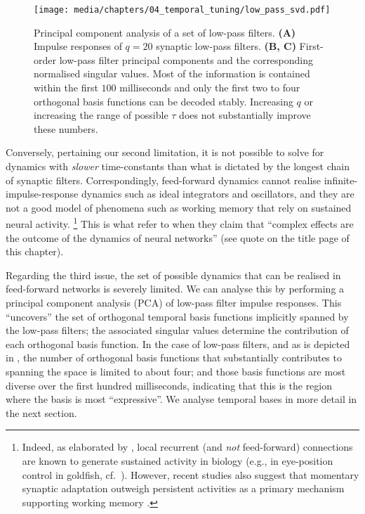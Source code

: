 \begin{figure}[p]
	\centering
	\texttt{[image: media/chapters/04\_temporal\_tuning/low\_pass\_svd.pdf]}
	\caption[Principal component analysis of a set of low-pass filters]{Principal component analysis of a set of low-pass filters. \textbf{(A)} Impulse responses of $q = 20$ synaptic low-pass filters. \textbf{(B, C)} First-order low-pass filter principal components and the corresponding normalised singular values. Most of the information is contained within the first $100$ milliseconds and only the first two to four orthogonal basis functions can be decoded stably. Increasing $q$ or increasing the range of possible $\tau$ does not substantially improve these numbers.}
	\label{fig:low_pass_svd}
\end{figure}

Conversely, pertaining our second limitation, it is not possible to solve for dynamics with \emph{slower} time-constants than what is dictated by the longest chain of synaptic filters.
Correspondingly, feed-forward dynamics cannot realise infinite-impulse-response dynamics such as ideal integrators and oscillators, and they are not a good model of phenomena such as working memory that rely on sustained neural activity.%
\footnote{Indeed, as elaborated by \citet[Section~8.4.1]{eliasmith2003neural}, local recurrent (and \emph{not} feed-forward) connections are known to generate sustained activity in biology (e.g., in eye-position control in goldfish, cf.~\cite{aksay2001vivo}).
However, recent studies also suggest that momentary synaptic adaptation outweigh persistent activities as a primary mechanism supporting working memory \citep{lundqvist2018working}.}
This is what \citet[Chapter~1, p.~4]{churchland1992computational} refer to when they claim that \enquote{complex effects are the outcome of the dynamics of neural networks} (see quote on the title page of this chapter).

Regarding the third issue, the set of possible dynamics that can be realised in feed-forward networks is severely limited.
We can analyse this by performing a principal component analysis (PCA) of low-pass filter impulse responses.
This \enquote{uncovers} the set of orthogonal temporal basis functions implicitly spanned by the low-pass filters; the associated singular values determine the contribution of each orthogonal basis function.
In the case of low-pass filters, and as is depicted in , the number of orthogonal basis functions that  substantially contributes to spanning the space is limited to about four; and those basis functions are most diverse over the first hundred milliseconds, indicating that this is the region where the basis is most \enquote{expressive}.
We analyse temporal bases in more detail in the next section.

